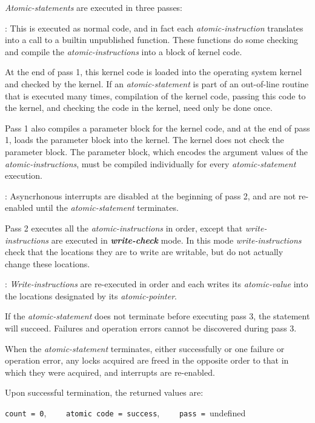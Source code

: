 \documentclass[12pt]{article}
\newcommand{\key}[1]{{\bf \em #1}\index{#1}}
\newenvironment{indpar}[1][0.3in]%
	{\begin{list}{}%
		     {\setlength{\itemsep}{0in}%
		      \setlength{\topsep}{0in}%
		      \setlength{\parsep}{1ex}%
		      \setlength{\labelwidth}{#1}%
		      \setlength{\leftmargin}{#1}%
		      \addtolength{\leftmargin}{\labelsep}}%
	 \item}%
	{\end{list}}
\begin{document}
{\em Atomic-statements} are executed in three passes:

\begin{indpar}[0.6in]
\hspace*{-0.3in}{\bf Pass 1, Compilation Pass}:
This is executed as normal code, and in fact each {\em atomic-instruction}
translates into a call to a builtin unpublished function.  These functions
do some checking and compile the {\em atomic-instructions} into a block
of kernel code.

At the end of pass 1, this kernel code is loaded into the operating
system kernel and checked by the kernel.
If an {\em atomic-statement}
is part of an out-of-line routine that is executed many times, compilation
of the kernel code, passing this code to the kernel, and checking the
code in the kernel, need only be done once.

Pass 1 also compiles a parameter block for the kernel code, and at the end
of pass 1, loads the parameter block into the kernel.  The kernel does
not check the parameter block.  The parameter block, which encodes the
argument values of the {\em atomic-instructions}, must be compiled
individually for every
{\em atomic-statement} execution.

\hspace*{-0.3in}{\bf Pass 2, Test Pass}: Asyncrhonous interrupts are
disabled at the beginning of pass 2, and are not re-enabled until
the {\em atomic-statement} terminates.

Pass 2 executes all the {\em atomic-instructions} in order, except that
{\em write-instructions} are executed in \key{write-check} mode.
In this mode {\em write-instructions} check that the locations
they are to write are writable, but do not actually change these locations.

\hspace*{-0.3in}{\bf Pass 3, Set Pass}: 
{\em Write-instructions} are re-executed in order and each writes its
{\em atomic-value} into the locations designated by its
{\em atomic-pointer}.

If the {\em atomic-statement} does not
terminate before executing pass 3, the statement will succeed.
Failures and operation errors cannot be discovered during pass 3.

When the {\em atomic-statement} terminates, either successfully or
one failure or operation error,
any locks acquired are freed in the opposite order
to that in which they were acquired, and interrupts are re-enabled.

Upon successful termination, the returned values are:
\begin{center}
{\tt count = 0},~~~~ {\tt atomic code = success},~~~~
{\tt pass = }undefined
\end{center}
\end{indpar}
\end{document}
